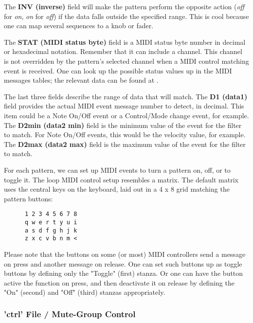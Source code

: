    The \textbf{INV (inverse)} field will make the pattern perform the opposite
   action (\textsl{off} for \textsl{on}, \textsl{on} for \textsl{off}) if the
   data falls outside the specified range.  This is cool because one can map
   several sequences to a knob or fader.

   The \textbf{STAT (MIDI status byte)} field is a MIDI status byte number in
   decimal or hexadecimal notation.
   Remember that it can include a channel.  This channel is not overridden by
   the pattern's selected channel when a MIDI control matching event is
   received. 
   One can look up the possible status values up in the MIDI messages tables;
   the relevant data can be found at \cite{midicontroltable}.

   The last three fields describe the range of data that will match.  The
   \textbf{D1 (data1)} field provides the actual MIDI event message number to
   detect, in decimal.  This item could be a Note On/Off event or a
   Control/Mode change event, for example.
   The \textbf{D2min (data2 min)} field is the minimum value of the event for
   the filter to match. For Note On/Off events, this would be the velocity
   value, for example.
   The \textbf{D2max (data2 max)} field is the maximum value of the event for
   the filter to match.


   For each pattern, we can set up MIDI events to turn a 
   pattern on, off, or to toggle it.
   The loop MIDI control setup resembles a matrix.  The default matrix
   uses the central keys on the keyboard, laid out in a 4 x 8 grid matching the
   pattern buttons:

   \begin{verbatim}
      1 2 3 4 5 6 7 8
      q w e r t y u i
      a s d f g h j k
      z x c v b n m <
   \end{verbatim}

   Please note that the buttons on some (or most) MIDI controllers send a
   message on press and another message on release.  One can set such buttons
   up as toggle buttons by defining only the "Toggle" (first) stanza.
   Or one can have the button active the function on press, and then deactivate
   it on release by defining the "On" (second) and "Off" (third) stanzas
   appropriately.

\subsubsection{'ctrl' File / Mute-Group Control}
\label{subsubsec:configuration_ctrl_mute_group_control}

